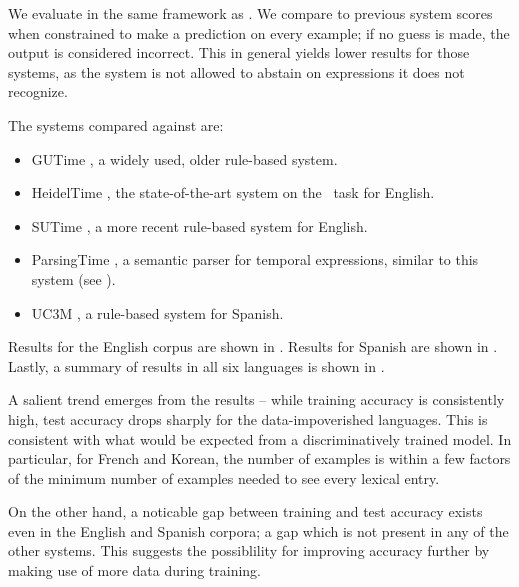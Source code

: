 We evaluate in the same framework as \me.
We compare to 
	previous system scores when constrained to make a prediction on every
	example; if no guess is made, the output is considered incorrect.
This in general yields lower results for those systems,
  as the system is not allowed to
	abstain on expressions it does not recognize.

The systems compared against are:
\begin{itemize}
\item GUTime \cite{key:2010strotgen-temporal}, a widely used, older rule-based
              system.
\item HeidelTime \cite{key:2010strotgen-temporal}, the state-of-the-art
                 system on the \tempeval\ task for English.
\item SUTime \cite{key:2012chang-temporal}, a more recent rule-based
             system for English.
\item ParsingTime \mec, a semantic parser for temporal expressions, similar to
                  this system (see ).
\item UC3M \cite{2010vicente-uc3m}, a rule-based system for
             Spanish.
\end{itemize}

Results for the English corpus are shown in .
Results for Spanish are shown in .
Lastly, a summary of results in all six languages is shown in
  .

A salient trend emerges from the results -- while training accuracy is
  consistently high, test accuracy drops sharply for the data-impoverished
  languages.
This is consistent with what would be expected from a discriminatively trained
  model.
In particular, for French and Korean, the number of examples is within a
  few factors of the minimum number of examples needed to see every
  lexical entry.

On the other hand, a noticable gap between training and test accuracy exists
  even in the English and Spanish corpora; a gap which is not present in any
  of the other systems.
This suggests the possiblility for improving accuracy further by making use of
  more data during training.
